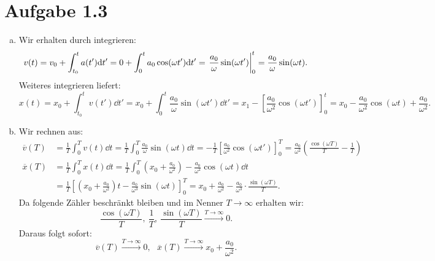 \documentclass{theozettel}
\begin{document}
\newpage
\section*{Aufgabe 1.3}
\begin{enumerate}[(a)]
	\item 	Wir erhalten durch integrieren:
			\[
				v(t) = v_{0} + \int_{t_{0}}^{t} a(t')\dd t' = 0 + \int_{0}^{t} a_{0}\cos(\omega t') \dd t' = \eval{\frac{a_{0}}{\omega} \sin(\omega t')}_{0}^{t} = \frac{a_{0}}{\omega} \sin(\omega t).
			\]
			Weiteres integrieren liefert:
			\[
				x(t) = x_{0} + \int_{t_{0}}^{t} v(t') \dd t' = x_{0} + \int_{0}^{t} \frac{a_{0}}{\omega} \sin(\omega t') \dd t' = x_{1} - \left[ \frac{a_{0}}{\omega^{2}} \cos(\omega t') \right]_{0}^{t} = x_{0} - \frac{a_{0}}{\omega^{2}} \cos(\omega t) + \frac{a_{0}}{\omega^{2}}.
			\]
	
	\item 	Wir rechnen aus:
			\begin{align*}
				\overline{v}(T) &= \frac{1}{T} \int_{0}^{T} v(t) \dd t = \frac{1}{T} \int_{0}^{T} \frac{a_{0}}{\omega} \sin(\omega t) \dd t = -\frac{1}{T} \left[ \frac{a_{0}}{\omega^{2}} \cos(\omega t') \right]_{0}^{T} = \frac{a_{0}}{\omega^{2}} \left( \frac{\cos(\omega T)}{T} - \frac{1}{T} \right) \\
				\overline{x}(T) &= \frac{1}{T} \int_{0}^{T} x(t) \dd t = \frac{1}{T} \int_{0}^{T} \left(x_{0}+\frac{a_{0}}{\omega^{2}}\right) - \frac{a_{0}}{\omega^{2}}\cos(\omega t) \dd t \\
				&= \frac{1}{T} \left[\left(x_{0}+\frac{a_{0}}{\omega^{2}}\right)t - \frac{a_{0}}{\omega^{3}}\sin(\omega t) \right]_{0}^{T} = x_{0}+\frac{a_{0}}{\omega^{2}} - \frac{a_{0}}{\omega^{3} } \cdot \frac{\sin(\omega T)}{T}.
			\end{align*}
			Da folgende Zähler beschränkt bleiben und im Nenner $T \to \infty$ erhalten wir:
			\[
				\frac{\cos(\omega T)}{T}, \ \frac{1}{T}, \ \frac{\sin(\omega T)}{T} \stackrel{T \to \infty}{\longrightarrow} 0.
			\]
			Daraus folgt sofort:
			\[
				\overline{v}(T) \stackrel{T \to \infty}{\longrightarrow} 0, \ \ \ \overline{x}(T) \stackrel{T \to \infty}{\longrightarrow} x_{0}+\frac{a_{0}}{\omega^{2}}.
			\]
\end{enumerate}

\newpage
\end{document}
